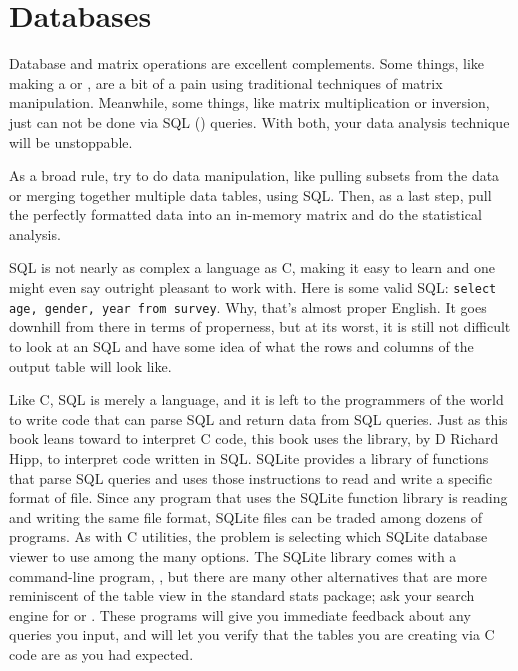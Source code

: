 \chapter{Databases} \label{sql}
\setsql %


Database and matrix operations are excellent
complements. Some things, like making a  or , are a bit of a
pain using traditional techniques of matrix manipulation. Meanwhile,
some things, like matrix multiplication or inversion, just can not be done via SQL ()
queries. With both, your data analysis technique will be unstoppable.

As a broad rule, try to do data manipulation, like pulling subsets
from the data or merging together multiple data tables, using SQL. Then,
as a last step, pull the perfectly formatted data into an in-memory matrix and
do the statistical analysis. 

SQL is not nearly as complex a language as C, making it easy to learn and
one might even say outright pleasant to work with. Here is some valid SQL:
{\tt select age, gender, year from survey}. Why, that's almost proper
English. It goes downhill from there in terms of properness, but at its
worst, it is still not difficult to look at an SQL  and have some
idea of what the rows and columns of the output table will look like.

Like C, SQL is merely a language, and it is left to the programmers of
the world to write code that can parse SQL and return data from SQL
queries. Just as this book leans toward  to interpret C code,
this book uses the  library, by D Richard Hipp, to interpret
code written in SQL. SQLite provides a library of functions that parse
SQL queries and uses those instructions to read and write a specific
format of file. Since any program that uses the SQLite function library
is reading and writing the same file format, SQLite files can be traded
among dozens of programs. As with C utilities, the problem is selecting
which SQLite database viewer to use among the many options. The SQLite
library comes with a command-line program, , but there
are many other alternatives that are more reminiscent of the table view
in the standard stats package; ask your search engine for  or . These programs will give you immediate
feedback about any queries you input, and will let you verify that the
tables you are creating via C code are as you had expected.


